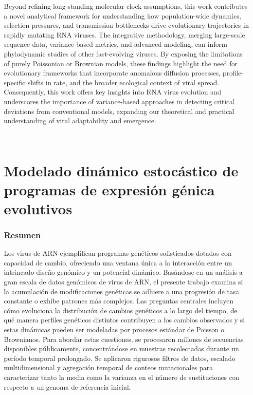 Beyond refining long-standing molecular clock assumptions, this work contributes a novel analytical framework for understanding how population-wide dynamics, selection pressures, and transmission bottlenecks drive evolutionary trajectories in rapidly mutating RNA viruses. The integrative methodology, merging large-scale sequence data, variance-based metrics, and advanced modeling, can inform phylodynamic studies of other fast-evolving viruses. By exposing the limitations of purely Poissonian or Brownian models, these findings highlight the need for evolutionary frameworks that incorporate anomalous diffusion processes, profile-specific shifts in rate, and the broader ecological context of viral spread. Consequently, this work offers key insights into RNA virus evolution and underscores the importance of variance-based approaches in detecting critical deviations from conventional models, expanding our theoretical and practical understanding of viral adaptability and emergence.


\vfill

\pagebreak ~

\chapter*{\Large Modelado dinámico estocástico de programas de expresión génica evolutivos}

\vspace{-1cm}

\subsection*{\myself}

\subsection*{Resumen}
Los virus de ARN ejemplifican programas genéticos sofisticados dotados con capacidad de cambio, ofreciendo una ventana única a la interacción entre un intrincado diseño genómico y un potencial dinámico. Basándose en un análisis a gran escala de datos genómicos de virus de ARN, el presente trabajo examina si la acumulación de modificaciones genéticas se adhiere a una progresión de tasa constante o exhibe patrones más complejos. Las preguntas centrales incluyen cómo evoluciona la distribución de cambios genéticos a lo largo del tiempo, de qué manera perfiles genéticos distintos contribuyen a los cambios observados y si estas dinámicas pueden ser modeladas por procesos estándar de Poisson o Brownianos. Para abordar estas cuestiones, se procesaron millones de secuencias disponibles públicamente, concentrándose en muestras recolectadas durante un período temporal prolongado. Se aplicaron rigurosos filtros de datos, escalado multidimensional y agregación temporal de conteos mutacionales para caracterizar tanto la media como la varianza en el número de sustituciones con respecto a un genoma de referencia inicial.


